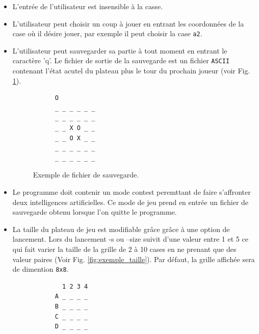 \documentclass[10pt,a4paper]{article}
\begin{document}
\begin {itemize}
\item  L'entrée de l'utilisateur est insensible à la casse.
\item  L'utilisateur peut choisir un coup à jouer en entrant les coordonnées de la case où il désire jouer, par exemple il peut choisir la case \verb!a2!.
\item  L'utilisateur peut sauvegarder sa partie à tout moment en entrant le caractère 'q'. Le fichier de sortie de la sauvegarde est un fichier \verb!ASCII! contenant l'état acutel du plateau plus le tour du prochain joueur (voir Fig. \ref{fig:exemple_save}).
  \begin{figure}[H]    
    \centering
    \begin{BVerbatim}
      O
      _ _ _ _ _ _
      _ _ _ _ _ _
      _ _ X O _ _
      _ _ O X _ _
      _ _ _ _ _ _
      _ _ _ _ _ _ 
    \end{BVerbatim}
    \caption {Exemple de fichier de sauvegarde.\label{fig:exemple_save}}
    \end{figure}

\item  Le programme doit contenir un mode contest peremttant de faire s'affronter deux intelligences artificielles. Ce mode de jeu prend en entrée un fichier de sauvegarde obtenu lorsque l'on quitte le programme.
\item  La taille du plateau de jeu est modifiable grâce grâce à une option de lancement. Lors du lancement -s ou --size suivit d'une valeur entre 1 et 5 ce qui fait varier la taille de la grille de 2 à 10 cases en ne prenant que des valeur paires (Voir Fig. \ref{fig:exemple_taille}). Par défaut, la grille affichée sera de dimention \verb!8x8!.
  \begin{figure}[H]    
    \centering
    \begin{BVerbatim}
        1 2 3 4 
      A _ _ _ _
      B _ _ _ _
      C _ _ _ _
      D _ _ _ _
      

\end{BVerbatim}
\end{figure}
\end{itemize}
\end{document}
